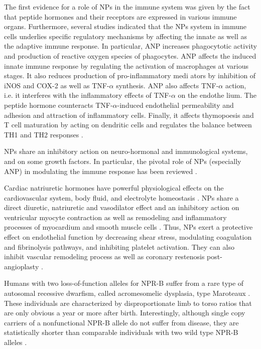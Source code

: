 \documentclass[14pt,a4paper,onecolumn]{extarticle}
\begin{document}
The first evidence for a role of NPs in the immune system was given by the fact that peptide hormones and their receptors are expressed in various immune organs. Furthermore, several studies indicated that the NPs system in immune cells underlies specific regulatory mechanisms by affecting the innate as well as the adaptive immune response. In particular, ANP increases phagocytotic activity and production of reactive oxygen species of phagocytes. ANP affects the induced innate immune response by regulating the activation of macrophages at various stages. It also reduces production of pro-inflammatory medi ators by inhibition of iNOS and COX-2 as well as TNF-$\alpha$ synthesis. ANP also affects TNF-$\alpha$ action, i.e. it interferes with the inflammatory effects of TNF-$\alpha$ on the endothe lium. The peptide hormone counteracts TNF-$\alpha$-induced endothelial permeability and adhesion and attraction of inflammatory cells. Finally, it affects thymopoesis and T cell maturation by acting on dendritic cells and regulates the balance between TH1 and TH2 responses \citep{99}. %

NPs share an inhibitory action on neuro-hormonal and immunological systems, and on some growth factors. In particular, the pivotal role of NPs (especially ANP) in modulating the immune response has been reviewed \citep{98}. %

Cardiac natriuretic hormones have powerful physiological effects on the cardiovascular system, body fluid, and electrolyte homeostasis \citep{13} \citep{28}. NPs share a direct diuretic, natriuretic and vasodilator effect and an inhibitory action on ventricular myocyte contraction \citep{79} as well as remodeling and inflammatory processes of myocardium and smooth muscle cells \citep{82} \citep{83}. Thus, NPs exert a protective effect on endothelial function by decreasing shear stress, modulating coagulation and fibrinolysis pathways, and inhibiting platelet activation. They can also inhibit vascular remodeling process as well as coronary restenosis post-angioplasty \citep{56} \citep{87} \citep{88} \citep{89}. %

Humans with two loss-of-function alleles for NPR-B suffer from a rare type of autosomal recessive dwarfism, called acromesomelic dysplasia, type Maroteaux \citep{Bartels2004}. These individuals are characterized by disproportionate limb to torso ratios that are only obvious a year or more after birth. Interestingly, although single copy carriers of a nonfunctional NPR-B allele do not suffer from disease, they are statistically shorter than comparable individuals with two wild type NPR-B alleles \citep{Olney2006}. %
\end{document}
